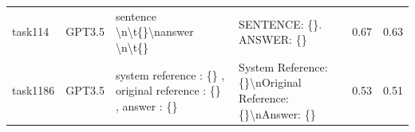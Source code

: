 \begin{longtable}{@{}p{0.8cm\tiny}p{1cm\tiny}p{4.1cm\ttfamily\tiny}p{4.1cm\ttfamily\tiny}p{0.8cm\tiny}p{0.8cm\tiny}@{}}
task114   & GPT3.5    & sentence \textbackslash{}n\textbackslash{}t\{\}\textbackslash{}nanswer \textbackslash{}n\textbackslash{}t\{\}                                                                                                                                                                                                                                                                                                                                                                                                           & SENTENCE: \{\}. ANSWER: \{\}                                                                                                                                                                                                                                                                                                                                                                                                                                                                                                                                                      & 0.67 & 0.63 \\
task1186  & GPT3.5    & system reference : \{\} , original reference : \{\} , answer : \{\}                                                                                                                                                                                                                                                                                                                                                                                                                                                     & System Reference: \{\}\textbackslash{}nOriginal Reference: \{\}\textbackslash{}nAnswer: \{\}                                                                                                                                                                                                                                                                                                                                                                                                                                                                                      & 0.53 & 0.51 \\

\end{longtable}
